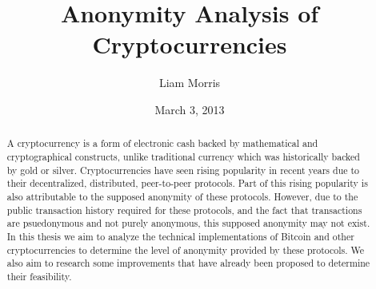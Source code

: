 \documentclass[11pt]{article}
\begin{document}
\begin{titlepage}
\title{Anonymity Analysis of Cryptocurrencies}
\author{Liam Morris \\
  }
\date{March 3, 2013}
\end{titlepage}
\maketitle
\vfill
\begin{abstract}
A cryptocurrency is a form of electronic cash backed by mathematical and
cryptographical constructs, unlike traditional currency which was historically
backed by gold or silver. Cryptocurrencies have seen rising popularity in recent
years due to their decentralized, distributed, peer-to-peer protocols. Part of
this rising popularity is also attributable to the supposed anonymity of these
protocols. However, due to the public transaction history required for these
protocols, and the fact that transactions are psuedonymous and not purely
anonymous, this supposed anonymity may not exist. In this thesis we aim to
analyze the technical implementations of Bitcoin and other cryptocurrencies to
determine the level of anonymity provided by these protocols. We also aim to
research some improvements that have already been proposed to determine their
feasibility.
\end{abstract}
\thispagestyle{empty}
\clearpage
{}
\tableofcontents
\listoffigures
\pagebreak
\addtocounter{footnote}{-1}
\end{document}
